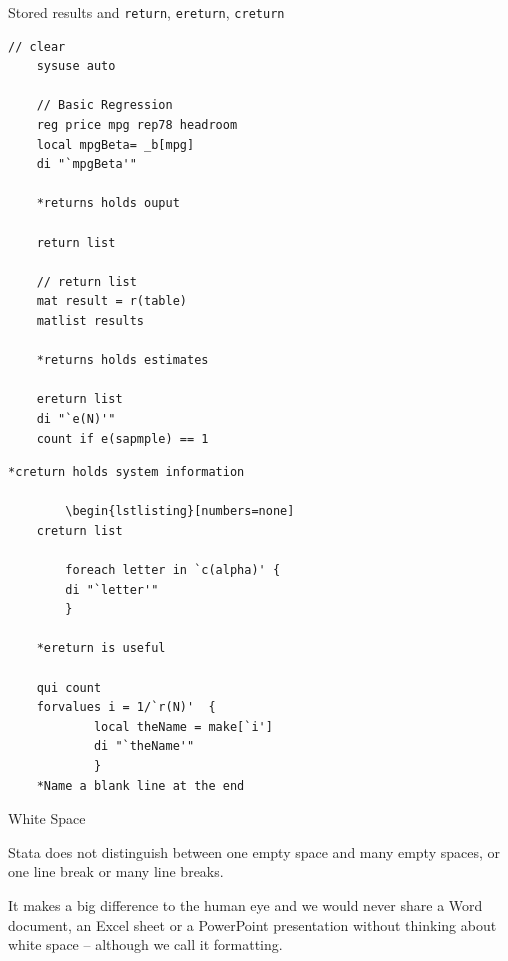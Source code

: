 \documentclass[aspectratio=169]{beamer}
\begin{document}
\begin{frame}[fragile]{Stored results and \texttt{return}, \texttt{ereturn}, \texttt{creturn}}
\begin{multicols}{2}
	\begin{lstlisting}[numbers=none]
	// clear
	sysuse auto
	
	// Basic Regression
	reg price mpg rep78 headroom
	local mpgBeta= _b[mpg]
	di "`mpgBeta'"
	
	*returns holds ouput
	
	return list
	
	// return list
	mat result = r(table)
	matlist results 

	*returns holds estimates
	
	ereturn list
	di "`e(N)'"
	count if e(sapmple) == 1
	\end{lstlisting}
	
	\begin{lstlisting}[numbers=none]
	*creturn holds system information
	
		\begin{lstlisting}[numbers=none]
	creturn list 
	
		foreach letter in `c(alpha)' {
		di "`letter'" 
		}
		
	*ereturn is useful
	
	qui count
	forvalues i = 1/`r(N)' 	{
			local theName = make[`i']
			di "`theName'"
			}
	*Name a blank line at the end
	\end{lstlisting}

\end{multicols}
\end{frame}



\begin{frame}{White Space}

	\leavevmode 	\newline Stata does not distinguish between one empty space and many empty spaces, or one line break or many line breaks.
	
	\leavevmode 	\newline It makes a big difference to the human eye and we would never share a Word document, an Excel sheet or a PowerPoint presentation without thinking about white space – although we call it formatting.

\end{frame}
\end{document}
